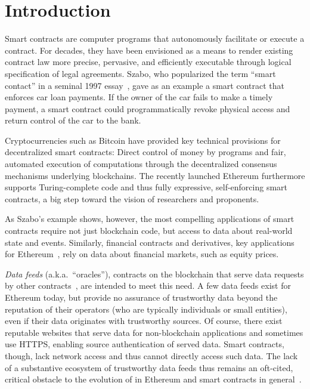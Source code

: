 \section{Introduction}

Smart contracts are computer programs that autonomously facilitate or execute a contract. For decades, they have been envisioned as a means to  render existing contract law more precise, pervasive, and efficiently executable through logical specification of legal agreements. Szabo, who popularized the term ``smart contact'' in a seminal 1997 essay~\cite{szabosmartcontract}, gave as an example a smart contract that enforces car loan payments. If the owner of the car fails to make a timely payment, a smart contract could programmatically revoke physical access and return control of the car to the bank. %

Cryptocurrencies such as Bitcoin have provided key technical provisions for decentralized smart contracts: Direct control of money by programs and fair, automated execution of computations through the decentralized consensus mechanisms underlying  blockchains. 
The recently launched Ethereum furthermore supports Turing-complete code and thus fully expressive, self-enforcing smart contracts, a big step toward the vision of researchers and proponents.  

As Szabo's example shows, however, the most compelling applications of smart contracts require not just blockchain code, but access to data about real-world state and events. Similarly, financial contracts and derivatives, key applications for Ethereum~\cite{yellowpaper,whitepaper}, rely on data about financial markets, such as equity prices. %

\emph{Data feeds} (a.k.a.~``oracles''), contracts on the blockchain that serve data requests by other contracts~\cite{whitepaper,yellowpaper}, are intended to meet this need. A few data feeds exist for Ethereum today, but provide no assurance of trustworthy data beyond the reputation of their operators (who are typically individuals or small entities), even if their data originates with trustworthy sources. Of course, there exist reputable websites that serve data for non-blockchain applications and sometimes use HTTPS, enabling source authentication of served data. Smart contracts, though, lack network access and thus cannot directly access such data. The lack of a substantive ecosystem of trustworthy data feeds thus remains an oft-cited, critical obstacle to the evolution of in Ethereum and smart contracts 
in general~\cite{commblockstream}.

